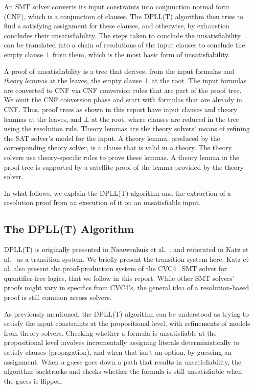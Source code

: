 \documentclass[11pt]{article}
\begin{document}
	An SMT solver converts its input 
	constraints into conjunction 
	normal form (CNF), which is a 
	conjunction of clauses. The 
	DPLL(T) algorithm then tries 
	to find a satisfying assignment 
	for these clauses, and 
	otherwise, by exhaustion 
	concludes their unsatisfiability.
	The steps taken to conclude 
	the unsatisfiability can be 
	translated into a chain of 
	resolutions of the input clauses 
	to conclude the empty clause 
	$\bot$ from them, which is the 
	most basic form of unsatisfiability.
	
	A proof of unsatisfiability is a tree
	that derives, from the input formulas
	and \textit{theory lemmas} at the
	leaves, the empty clause $\bot$ at the root.
	The input formulas are converted to CNF
	via CNF conversion rules that are 
	part of the proof tree. We omit the 
	CNF conversion phase and start 
	with formulas that are already in 
	CNF. Thus, proof trees as shown in 
	this report have input clauses 
	and theory lemmas at the leaves, 
	and $\bot$ at the root, where 
	clauses are reduced in the tree 
	using the resolution rule. Theory 
	lemmas are the theory solvers' 
	means of refining the SAT solver's
	model for the input. A
	theory lemma, produced by the 
	corresponding theory
	solver, is a clause that is
	valid in a theory. The theory 
	solvers use theory-specific 
	rules to prove these 
	lemmas. A theory lemma in the 
	proof tree is supported by a 
	satellite proof of the lemma
	provided by the theory solver. 
	
	In what follows, we explain the 
	DPLL(T) algorithm and the 
	extraction of a resolution proof
	from an execution of it on an 
	unsatisfiable input.
	
	\subsection{The DPLL(T) Algorithm}
	\label{sec:dpllt}
	
	DPLL(T) is originally presented 
	in Nieuwenhuis et 
	al.~\cite{DBLP:journals/jacm/NieuwenhuisOT06}, 
	and reiterated in Katz et 
	al.~\cite{DBLP:conf/fmcad/KatzBTRH16} 
	as a transition system. We briefly present 
	the transition system here. Katz et al. also 
	present the proof-production system of the 
	CVC4~\cite{DBLP:conf/cav/BarrettCDHJKRT11} 
	SMT solver for quantifier-free logics,
	that we follow in this report. While 
	other SMT solvers'
	proofs might vary in specifics from 
	CVC4's, the general idea of a 
	resolution-based proof is still common 
	across solvers.
	
	As previously mentioned, the DPLL(T)
	algorithm can be understood as 
	trying to satisfy the input constraints
	at the propositional level, with 
	refinements of models from 
	theory solvers. Checking whether a
	formula is unsatisfiable at the 
	propositional level involves 
	incrementally assigning literals
	deterministically to satisfy clauses
	(propagation), and when that isn't an 
	option, by guessing an 
	assignment. When a guess goes 
	down a path that results in 
	unsatisfiability, the algorithm 
	backtracks and checks whether the 
	formula is still unsatisfiable 
	when the guess is flipped.
	
\end{document}
